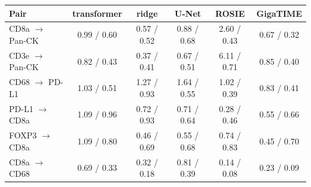 \begin{tabular}{@{}lccccc@{}}
\toprule
Pair & transformer & ridge & U-Net & ROSIE & GigaTIME \\
\midrule
CD8a $\to$ Pan-CK & 0.99 / 0.60 & 0.57 / 0.52 & 0.88 / 0.68 & 2.60 / 0.43 & 0.67 / 0.32 \\
CD3e $\to$ Pan-CK & 0.82 / 0.43 & 0.37 / 0.41 & 0.67 / 0.51 & 6.11 / 0.71 & 0.85 / 0.40 \\
CD68 $\to$ PD-L1 & 1.03 / 0.51 & 1.27 / 0.93 & 1.64 / 0.55 & 1.02 / 0.39 & 0.83 / 0.41 \\
PD-L1 $\to$ CD8a & 1.09 / 0.96 & 0.72 / 0.93 & 0.71 / 0.64 & 0.28 / 0.46 & 0.55 / 0.66 \\
FOXP3 $\to$ CD8a & 1.09 / 0.80 & 0.46 / 0.69 & 0.55 / 0.68 & 0.74 / 0.83 & 0.45 / 0.70 \\
CD8a $\to$ CD68 & 0.69 / 0.33 & 0.32 / 0.18 & 0.81 / 0.39 & 0.14 / 0.08 & 0.23 / 0.09 \\
\bottomrule
\end{tabular}
